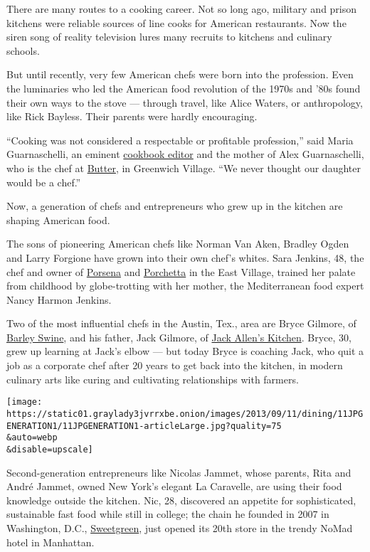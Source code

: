 There are many routes to a cooking career. Not so long ago, military and
prison kitchens were reliable sources of line cooks for American
restaurants. Now the siren song of reality television lures many
recruits to kitchens and culinary schools.

But until recently, very few American chefs were born into the
profession. Even the luminaries who led the American food revolution of
the 1970s and '80s found their own ways to the stove --- through travel,
like Alice Waters, or anthropology, like Rick Bayless. Their parents
were hardly encouraging.

``Cooking was not considered a respectable or profitable profession,''
said Maria Guarnaschelli, an eminent
\href{http://www.nytimes3xbfgragh.onion/2006/11/01/dining/01jside.html}{cookbook
editor} and the mother of Alex Guarnaschelli, who is the chef at
\href{http://events.nytimes3xbfgragh.onion/mem/nycreview.html?res=9A00EFD8163EF935A15755C0A9649C8B63}{Butter},
in Greenwich Village. ``We never thought our daughter would be a chef.''

Now, a generation of chefs and entrepreneurs who grew up in the kitchen
are shaping American food.

The sons of pioneering American chefs like Norman Van Aken, Bradley
Ogden and Larry Forgione have grown into their own chef's whites. Sara
Jenkins, 48, the chef and owner of \href{http://porsena.com/}{Porsena}
and \href{http://www.porchettanyc.com/}{Porchetta} in the East Village,
trained her palate from childhood by globe-trotting with her mother, the
Mediterranean food expert Nancy Harmon Jenkins.

Two of the most influential chefs in the Austin, Tex., area are Bryce
Gilmore, of \href{http://barleyswine.com/}{Barley Swine}, and his
father, Jack Gilmore, of \href{http://www.jackallenskitchen.com/}{Jack
Allen's Kitchen}. Bryce, 30, grew up learning at Jack's elbow --- but
today Bryce is coaching Jack, who quit a job as a corporate chef after
20 years to get back into the kitchen, in modern culinary arts like
curing and cultivating relationships with farmers.

\texttt{[image: https://static01.graylady3jvrrxbe.onion/images/2013/09/11/dining/11JPGENERATION1/11JPGENERATION1-articleLarge.jpg?quality=75\\\&auto=webp\\\&disable=upscale]}

Second-generation entrepreneurs like Nicolas Jammet, whose parents, Rita
and André Jammet, owned New York's elegant La Caravelle, are using their
food knowledge outside the kitchen. Nic, 28, discovered an appetite for
sophisticated, sustainable fast food while still in college; the chain
he founded in 2007 in Washington, D.C.,
\href{http://sweetgreen.com/}{Sweetgreen}, just opened its 20th store in
the trendy NoMad hotel in Manhattan.

